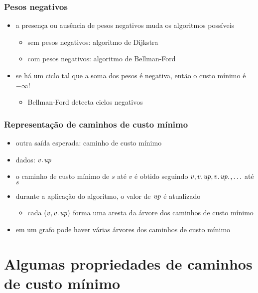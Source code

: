 \documentclass{beamer}
\begin{document}
\begin{frame}
\frametitle{Pesos negativos}

\begin{itemize}
\item a presença ou ausência de pesos negativos muda os algoritmos possíveis
\begin{itemize}
\item sem pesos negativos: algoritmo de Dijkstra
\item com pesos negativos: algoritmo de Bellman-Ford
\end{itemize}
\item se há um ciclo tal que a soma dos pesos é negativa, então o custo
mínimo é $-\infty$!
\begin{itemize}
\item Bellman-Ford detecta ciclos negativos
\end{itemize}
\end{itemize}
\end{frame}

\begin{frame}
\frametitle{Representação de caminhos de custo mínimo}

\begin{itemize}
\item outra saída esperada: caminho de custo mínimo
\item dados: $\attrib{v}{up}$
\item o caminho de custo mínimo de $s$ até $v$ é obtido 
  seguindo $v, \attrib{v}{up}, \attrib{\attrib{v}{up}}, \ldots$
  até $s$
\item durante a aplicação do algoritmo, o valor de $\id{up}$ é 
  atualizado
\begin{itemize}
\item cada $(v, \attrib{v}{up})$ forma uma aresta da \alert{árvore dos caminhos de custo mínimo} 
\end{itemize}
\item em um grafo pode haver várias árvores dos caminhos de custo mínimo
\end{itemize}
\end{frame}

\section{Algumas propriedades de caminhos de custo mínimo}
\end{document}
